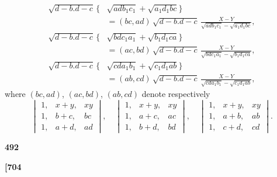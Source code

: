 \documentclass[12pt,a4paper]{article}
\theoremstyle{definition}
\begin{document}
\begin{align*}
\sqrt{d - b . d - c}\, \{&\sqrt{adb_1 c_1} + \sqrt{a_1 d_1 bc}\} \\
&= (bc, ad)\, \sqrt{d - b . d - c}\, \frac{X - Y}{\sqrt{adb_1 c_1} - \sqrt{a_1 d_1 bc}}, \\
\sqrt{d - b . d - c}\, \{&\sqrt{bdc_1 a_1} + \sqrt{b_1 d_1 ca}\} \\
&= (ac, bd)\, \sqrt{d - b . d - c}\, \frac{X - Y}{\sqrt{bdc_1 a_1} - \sqrt{b_1 d_1 ca}}, \\
\sqrt{d - b . d - c}\, \{&\sqrt{cda_1 b_1} + \sqrt{c_1 d_1 ab}\} \\
&= (ab, cd)\, \sqrt{d - b . d - c}\, \frac{X - Y}{\sqrt{cda_1 b_1} - \sqrt{c_1 d_1 ab}},
\end{align*}
where $(bc, ad)$, $(ac, bd)$, $(ab, cd)$ denote respectively
\[
\begin{vmatrix}
1, & x + y, & xy \\
1, & b + c, & bc \\
1, & a + d, & ad
\end{vmatrix},\quad
\begin{vmatrix}
1, & x + y, & xy \\
1, & a + c, & ac \\
1, & b + d, & bd
\end{vmatrix},\quad
\begin{vmatrix}
1, & x + y, & xy \\
1, & a + b, & ab \\
1, & c + d, & cd
\end{vmatrix}.
\]

\vspace{1em}

\begin{center}
\textbf{492}
\end{center}

\vspace{0.5em}

\noindent\textbf{[704}

\vspace{0.5em}
\end{document}
